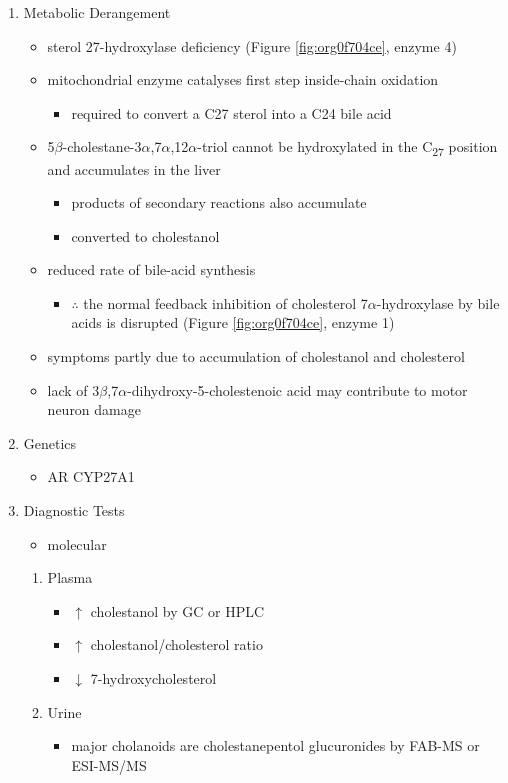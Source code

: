 \documentclass[12pt]{scrartcl}
\begin{document}
\begin{enumerate}
\item Metabolic Derangement
\label{sec:orgfea2e00}
\begin{itemize}
\item sterol 27-hydroxylase deficiency (Figure \ref{fig:org0f704ce}, enzyme 4)
\item mitochondrial enzyme catalyses first step inside-chain oxidation
\begin{itemize}
\item required to convert a C27 sterol into a C24 bile acid
\end{itemize}
\item 5\(\beta\)-cholestane-3\(\alpha\),7\(\alpha\),12\(\alpha\)-triol cannot be hydroxylated in the C\textsubscript{27}
position and accumulates in the liver
\begin{itemize}
\item products of secondary reactions also accumulate
\item converted to cholestanol
\end{itemize}
\item reduced rate of bile-acid synthesis
\begin{itemize}
\item \(\therefore\) the normal feedback inhibition of cholesterol
7\(\alpha\)-hydroxylase by bile acids is disrupted (Figure \ref{fig:org0f704ce}, enzyme 1)
\end{itemize}
\item symptoms partly due to accumulation of cholestanol and cholesterol
\item lack of 3\(\beta\),7\(\alpha\)-dihydroxy-5-cholestenoic acid may contribute to motor
neuron damage
\end{itemize}

\item Genetics
\label{sec:orge7fb0ac}
\begin{itemize}
\item AR CYP27A1
\end{itemize}
\item Diagnostic Tests
\label{sec:orgfbcb1d9}
\begin{itemize}
\item molecular
\end{itemize}
\begin{enumerate}
\item Plasma
\label{sec:orga5c6185}
\begin{itemize}
\item \(\uparrow\) cholestanol by GC or HPLC
\item \(\uparrow\) cholestanol/cholesterol ratio
\item \(\downarrow\) 7-hydroxycholesterol
\end{itemize}
\item Urine
\label{sec:orgfcc45ef}
\begin{itemize}
\item major cholanoids are cholestanepentol glucuronides by FAB-MS or ESI-MS/MS
\end{itemize}
\end{enumerate}


\end{enumerate}
\end{document}
